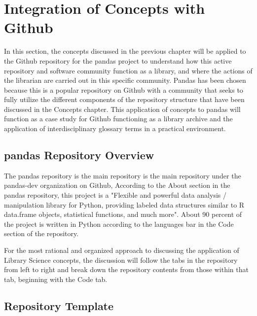 \section{Integration of Concepts with Github}

In this section, the concepts discussed in the previous chapter will be applied to the Github repository for the pandas project to understand how this active repository and software community function as a library, and where the actions of the librarian are carried out in this specific community. Pandas has been chosen because this is a popular repository on Github with a community that seeks to fully utilize the different components of the repository structure that have been discussed in the Concepts chapter. This application of concepts to pandas will function as a case study for Github functioning as a library archive and the application of interdisciplinary glossary terms in a practical environment. 

\subsection{pandas Repository Overview}

The pandas repository is the main repository is the main repository under the pandas-dev organization on Github, According to the About section in the pandas repository, this project is a "Flexible and powerful data analysis / manipulation library for Python, providing labeled data structures similar to R data.frame objects, statistical functions, and much more"\cite{pandasrepo}. About 90 percent of the project is written in Python according to the languages bar in the Code section of the repository\cite{pandasrepo}. 

For the most rational and organized approach to discussing the application of Library Science concepts, the discussion will follow the tabs in the repository from left to right and break down the repository contents from those within that tab, beginning with the Code tab. 

\subsection{Repository Template}

